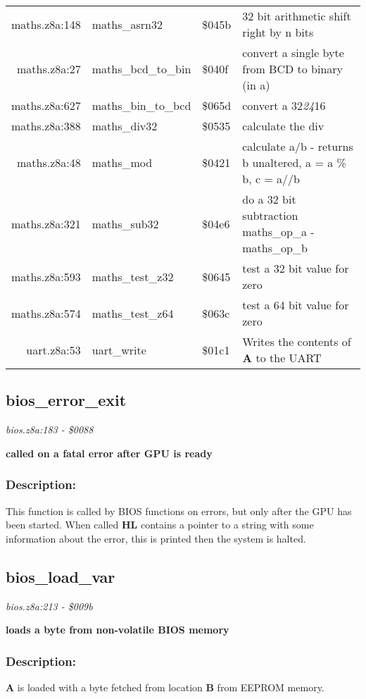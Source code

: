 \begin{tabular}{rllp{7cm}}
 maths.z8a:148&maths\_asrn32&\$045b&32 bit arithmetic shift right by n bits\\
 maths.z8a:27&maths\_bcd\_to\_bin&\$040f&convert a single byte from BCD to binary (in a)\\
 maths.z8a:627&maths\_bin\_to\_bcd&\$065d&convert a 32\textit{24}16\\
 maths.z8a:388&maths\_div32&\$0535&calculate the div\\
 maths.z8a:48&maths\_mod&\$0421&calculate a/b - returns b unaltered, a = a \% b, c = a//b\\
 maths.z8a:321&maths\_sub32&\$04e6&do a 32 bit subtraction maths\_op\_a - maths\_op\_b\\
 maths.z8a:593&maths\_test\_z32&\$0645&test a 32 bit value for zero\\
 maths.z8a:574&maths\_test\_z64&\$063c&test a 64 bit value for zero\\
 uart.z8a:53&uart\_write&\$01c1&Writes the contents of \textbf{A} to the UART\\
\end{tabular}

\subsection{bios\_error\_exit}
\textit{bios.z8a:183 - \$0088}

\noindent
\textbf{called on a fatal error after GPU is ready}

\subsubsection{Description:}
 This function is called by BIOS functions on errors, but only after the GPU has been started.  When called \textbf{HL} contains a pointer to a string with some information about the error, this is printed then the system is halted.

\subsection{bios\_load\_var}
\textit{bios.z8a:213 - \$009b}

\noindent
\textbf{loads a byte from non-volatile BIOS memory}

\subsubsection{Description:}
 \textbf{A} is loaded with a byte fetched from location \textbf{B} from EEPROM memory.

